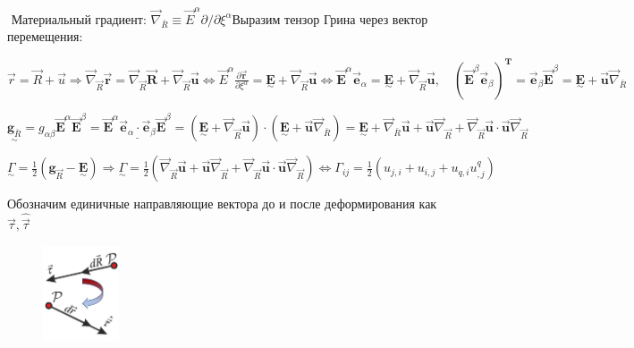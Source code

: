 $
\displaystyle
\text { Материальный градиент: } \vec{\nabla}_{\bar{R}} \equiv \vec{E}^\alpha \partial / \partial \xi^\alpha$Выразим тензор Грина через вектор перемещения:


$
\displaystyle
\vec{r}=\vec{R}+\vec{u} \Rightarrow \vec{\nabla}_{\vec{R}} \overrightarrow{\mathbf{r}}=\vec{\nabla}_{\vec{R}} \overrightarrow{\mathbf{R}}+\vec{\nabla}_{\vec{R}} \overrightarrow{\mathbf{u}} \Leftrightarrow \vec{E}^\alpha \frac{\partial \overrightarrow{\mathbf{r}}}{\partial \xi^\alpha}=\underset{\sim}{\mathbf{E}}+\vec{\nabla}_{\vec{R}} \overrightarrow{\mathbf{u}} \Leftrightarrow \overrightarrow{\mathbf{E}}^\alpha \overrightarrow{\mathbf{e}}_\alpha=\underset{\sim}{\mathbf{E}}+\vec{\nabla}_{\vec{R}} \overrightarrow{\mathbf{u}}, \quad\left(\overrightarrow{\mathbf{E}}^\beta \overrightarrow{\mathbf{e}}_\beta\right)^{\mathbf{T}}=\overrightarrow{\mathbf{e}}_\beta \overrightarrow{\mathbf{E}}^\beta=\underset{\sim}{\mathbf{E}}+\overrightarrow{\mathbf{u}} \vec{\nabla}_{\bar{R}}
$

$\underset{\sim}{\mathbf{g}_{\bar{R}}}=g_{\alpha \beta} \overrightarrow{\mathbf{E}}^\alpha \overrightarrow{\mathbf{E}}^\beta=\underline{\overrightarrow{\mathbf{E}}^\alpha \overrightarrow{\mathbf{e}}_\alpha \cdot \overrightarrow{\mathbf{e}}_\beta \overrightarrow{\mathbf{E}}^\beta}=\left(\underset{\sim}{\mathbf{E}}+\vec{\nabla}_{\vec{R}} \overrightarrow{\mathbf{u}}\right) \cdot\left(\underset{\sim}{\mathbf{E}}+\overrightarrow{\mathbf{u}} \vec{\nabla}_{\bar{R}}\right)=\underset{\sim}{\mathbf{E}}+\vec{\nabla}_{\bar{R}} \overrightarrow{\mathbf{u}}+\overrightarrow{\mathbf{u}} \vec{\nabla}_{\vec{R}}+\vec{\nabla}_{\vec{R}} \overrightarrow{\mathbf{u}} \cdot \overrightarrow{\mathbf{u}} \vec{\nabla}_{\vec{R}}$

$\displaystyle \underset{\sim}{\Gamma}=\frac{1}{2}\left(\mathbf{g}_{\vec{R}}-\underset{\sim}{\mathbf{E}}\right) \Rightarrow \underset{\sim}{\Gamma}=\frac{1}{2}\left(\vec{\nabla}_{\vec{R}} \overrightarrow{\mathbf{u}}+\overrightarrow{\mathbf{u}} \vec{\nabla}_{\vec{R}}+\vec{\nabla}_{\vec{R}} \overrightarrow{\mathbf{u}} \cdot \overrightarrow{\mathbf{u}} \vec{\nabla}_{\vec{R}}\right) \Leftrightarrow \Gamma_{i j}=\frac{1}{2}\left(u_{j, i}+u_{i, j}+u_{q, i} u_{, j}^q\right)$

Обозначим единичные направляющие вектора до и после деформирования как $\vec{\tau}, \hat\vec{\tau}$

\begin{figure}[h!]
  \centering
  \includegraphics[width=0.2\textwidth]{images/10.2.jpg}
\end{figure}


